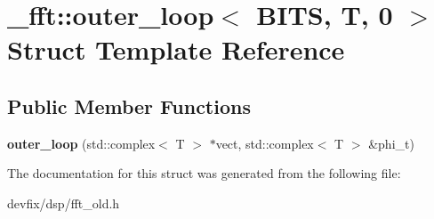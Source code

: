 \hypertarget{struct__fft_1_1outer__loop_3_01BITS_00_01T_00_010_01_4}{}\section{\+\_\+fft\+:\+:outer\+\_\+loop$<$ B\+I\+TS, T, 0 $>$ Struct Template Reference}
\label{struct__fft_1_1outer__loop_3_01BITS_00_01T_00_010_01_4}
\subsection*{Public Member Functions}
\begin{DoxyCompactItemize}
\item 
\mbox{\label{struct__fft_1_1outer__loop_3_01BITS_00_01T_00_010_01_4_af595c8c4145ede5bb9efd10ba1cecb9d}} 
{\bfseries outer\+\_\+loop} (std\+::complex$<$ T $>$ $\ast$vect, std\+::complex$<$ T $>$ \&phi\+\_\+t)
\end{DoxyCompactItemize}


The documentation for this struct was generated from the following file\+:\begin{DoxyCompactItemize}
\item 
devfix/dsp/fft\+\_\+old.\+h\end{DoxyCompactItemize}
